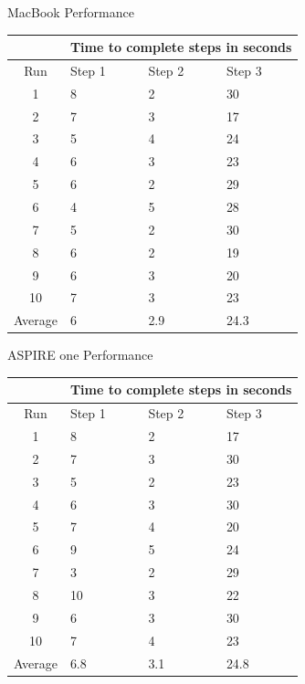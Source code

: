 \documentclass{beamer}
\begin{document}
\begin{frame}{MacBook Performance}
  \begin{tabularx}{275pt}{| c | X | X | X |}
    \hline
    & \multicolumn{3}{c|}{Time to complete steps in seconds} \\ \hline
    Run      & Step 1 & Step 2 & Step 3 \\ \hline
    1        & 8      & 2      & 30     \\ \hline
    2        & 7      & 3      & 17     \\ \hline
    3        & 5      & 4      & 24     \\ \hline
    4        & 6      & 3      & 23     \\ \hline
    5        & 6      & 2      & 29     \\ \hline
    6        & 4      & 5      & 28     \\ \hline
    7        & 5      & 2      & 30     \\ \hline
    8        & 6      & 2      & 19     \\ \hline
    9        & 6      & 3      & 20     \\ \hline
    10       & 7      & 3      & 23     \\ \hline
    Average  & 6      & 2.9    & 24.3   \\
    \hline
  \end{tabularx}
\end{frame}

\begin{frame}{ASPIRE one Performance}
  \begin{tabularx}{275pt}{| c | X | X | X |}
    \hline
    & \multicolumn{3}{c|}{Time to complete steps in seconds} \\ \hline
    Run          & Step 1 & Step 2 & Step 3 \\ \hline
    1            & 8      & 2      & 17     \\ \hline
    2            & 7      & 3      & 30     \\ \hline
    3            & 5      & 2      & 23     \\ \hline
    4            & 6      & 3      & 30     \\ \hline
    5            & 7      & 4      & 20     \\ \hline
    6            & 9      & 5      & 24     \\ \hline
    7            & 3      & 2      & 29     \\ \hline
    8            & 10     & 3      & 22     \\ \hline
    9            & 6      & 3      & 30     \\ \hline
    10           & 7      & 4      & 23     \\ \hline
    Average      & 6.8    & 3.1    & 24.8   \\
    \hline
  \end{tabularx}
\end{frame}
\end{document}
